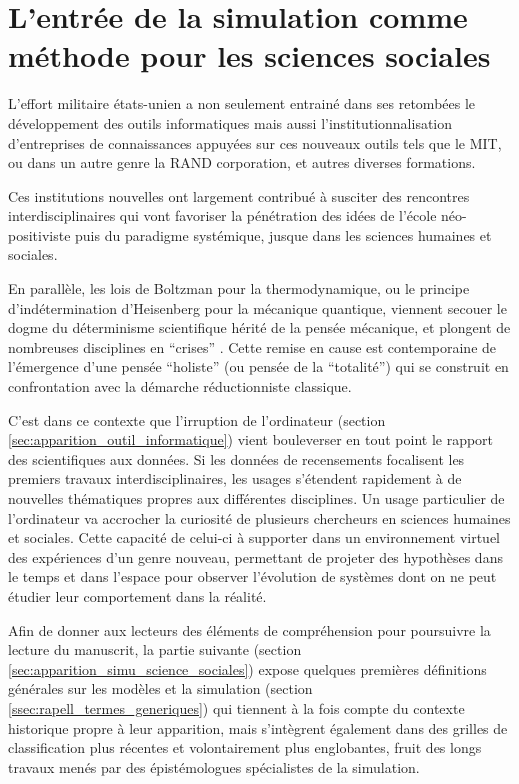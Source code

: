 

\section{L'entrée de la simulation comme méthode pour les sciences sociales}

L'effort militaire états-unien a non seulement entrainé dans ses retombées le développement des outils informatiques mais aussi l'institutionnalisation d'entreprises de connaissances appuyées sur ces nouveaux outils tels que le MIT, ou dans un autre genre la RAND corporation, et autres diverses formations.

Ces institutions nouvelles ont largement contribué à susciter des rencontres interdisciplinaires qui vont favoriser la pénétration des idées de l'école néo-positiviste puis du paradigme systémique, jusque dans les sciences humaines et sociales.

En parallèle, les lois de Boltzman pour la thermodynamique, ou le principe d’indétermination d'Heisenberg pour la mécanique quantique, viennent secouer le dogme du déterminisme scientifique hérité de la pensée mécanique, et plongent de nombreuses disciplines en \enquote{crises} \autocite[20-23]{Pouvreau2013}. Cette remise en cause est contemporaine de l'émergence d'une pensée \enquote{holiste} (ou pensée de la \enquote{totalité}) qui se construit en confrontation avec la démarche réductionniste classique.

C'est dans ce contexte que l'irruption de l'ordinateur (section \ref{sec:apparition_outil_informatique}) vient bouleverser en tout point le rapport des scientifiques aux données. Si les données de recensements focalisent les premiers travaux interdisciplinaires, les usages s'étendent rapidement à de nouvelles thématiques propres aux différentes disciplines. Un usage particulier de l'ordinateur va accrocher la curiosité de plusieurs chercheurs en sciences humaines et sociales. Cette capacité de celui-ci à supporter dans un environnement virtuel des expériences d'un genre nouveau, permettant de projeter des hypothèses dans le temps et dans l'espace pour observer l'évolution de systèmes dont on ne peut étudier leur comportement dans la réalité.

Afin de donner aux lecteurs des éléments de compréhension pour poursuivre la lecture du manuscrit, la partie suivante (section \ref{sec:apparition_simu_science_sociales}) expose quelques premières définitions générales sur les modèles et la simulation (section \ref{ssec:rapell_termes_generiques}) qui tiennent à la fois compte du contexte historique propre à leur apparition, mais s'intègrent également dans des grilles de classification plus récentes et volontairement plus englobantes, fruit des longs travaux menés par des épistémologues spécialistes de la simulation.

